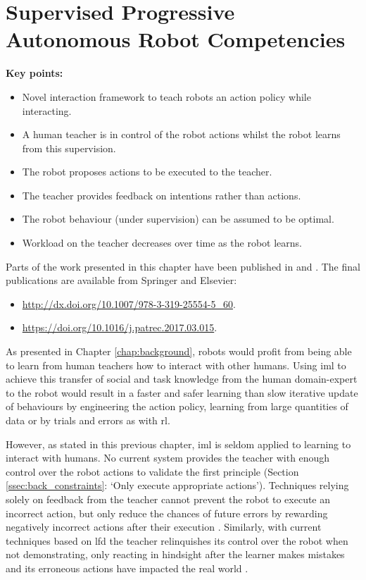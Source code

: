 \chapter{Supervised Progressive Autonomous Robot \newline Competencies}\label{chap:sparc}

\graphicspath{{images/sparc/}}

\begin{framed}
	\textbf{Key points:}
	\begin{itemize}
		\item Novel interaction framework to teach robots an action policy while interacting.
		\item A human teacher is in control of the robot actions whilst the robot learns from this supervision.
		\item The robot proposes actions to be executed to the teacher.
		\item The teacher provides feedback on intentions rather than actions.
		\item The robot behaviour (under supervision) can be assumed to be optimal.
		\item Workload on the teacher decreases over time as the robot learns.
	\end{itemize}
\end{framed}

Parts of the work presented in this chapter have been published in \cite{senft2015sparc} and \cite{senft2017supervised}. The final publications are available from Springer and Elsevier:
\begin{itemize}
	\item \url{http://dx.doi.org/10.1007/978-3-319-25554-5_60}.
	\item \url{https://doi.org/10.1016/j.patrec.2017.03.015}.
\end{itemize}

\newpage

As presented in Chapter \ref{chap:background}, robots would profit from being able to learn from human teachers how to interact with other humans. Using \acrfull{iml} to achieve this transfer of social and task knowledge from the human domain-expert to the robot would result in a faster and safer learning than slow iterative update of behaviours by engineering the action policy, learning from large quantities of data or by trials and errors as with \acrfull{rl}.

However, as stated in this previous chapter, \gls{iml} is seldom applied to learning to interact with humans. No current system provides the teacher with enough control over the robot actions to validate the first principle (Section \ref{ssec:back_constraints}: `Only execute appropriate actions'). Techniques relying solely on feedback from the teacher cannot prevent the robot to execute an incorrect action, but only reduce the chances of future errors by rewarding negatively incorrect actions after their execution \citep{senft2017supervised}. Similarly, with current techniques based on \acrfull{lfd} the teacher relinquishes its control over the robot when not demonstrating, only reacting in hindsight after the learner makes mistakes and its erroneous actions have impacted the real world \citep{chernova2009interactive}.

